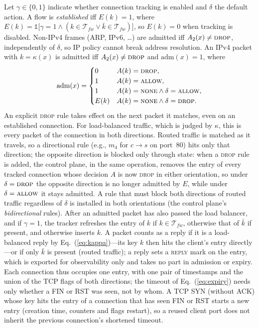 \documentclass[conference]{IEEEtran}
\begin{document}
Let $\gamma\in\{0,1\}$ indicate whether connection tracking is enabled and
$\delta$ the default action. A flow is \emph{established} iff $E(k)=1$, where
$E(k) = \mathbb{1}\big[\gamma = 1 \land (k \in \mathcal{T}_{fw} \lor \bar k \in
\mathcal{T}_{fw})\big]$, so $E(k)=0$ when tracking is disabled. Non-IPv4
frames (ARP, IPv6, \dots) are admitted iff $A_2(x) \ne \textsc{drop}$,
independently of $\delta$, so IP policy cannot break address resolution. An
IPv4 packet with $k=\kappa(x)$ is admitted iff $A_2(x) \ne \textsc{drop}$ and
$\mathrm{adm}(x)=1$, where
\begin{equation}
\mathrm{adm}(x) =
\begin{cases}
0 & A(k) = \textsc{drop},\\
1 & A(k) = \textsc{allow},\\
1 & A(k) = \textsc{none} \land \delta=\textsc{allow},\\
E(k) & A(k) = \textsc{none} \land \delta = \textsc{drop}.
\end{cases}
\label{eq:adm}
\end{equation}
An explicit \textsc{drop} rule takes effect on the next packet it matches,
even on an established connection. For load-balanced traffic, which is judged
by $\kappa$, this is every packet of the connection in both directions. Routed
traffic is matched as it travels, so a directional rule (e.g., $m_4$ for
$c\to s$ on port~80) hits only that direction; the opposite direction is
blocked only through state: when a \textsc{drop} rule is added, the control
plane, in the same operation, removes the entry of every tracked connection whose
decision $A$ is now \textsc{drop} in either orientation, so under
$\delta=\textsc{drop}$ the opposite direction is no longer admitted by $E$,
while under $\delta=\textsc{allow}$ it stays admitted. A rule that must block
both directions of routed traffic regardless of $\delta$ is installed in both
orientations (the control plane's \emph{bidirectional} rules). After an admitted
packet has also passed the load balancer, and if $\gamma=1$, the tracker
refreshes the entry of $k$ if $k\in\mathcal{T}_{fw}$, otherwise that of $\bar
k$ if present, and otherwise inserts $k$. A packet counts as a reply if it is
a load-balanced reply by Eq.~(\ref{eq:kappa})---its key $k$ then hits the
client's entry directly---or if only $\bar k$ is present (routed traffic);
a reply sets a \textsc{reply} mark on the entry, which is exported for
observability only and takes no part in admission or expiry. Each connection
thus occupies one entry, with one pair of timestamps and the union of the TCP
flags of both directions; the timeout of Eq.~(\ref{eq:expiry}) needs only
whether a FIN or RST was seen, not by whom. A TCP SYN (without ACK) whose key
hits the entry of a connection that has seen FIN or RST starts a new entry
(creation time, counters and flags restart), so a reused client port does not
inherit the previous connection's shortened timeout.
\end{document}
